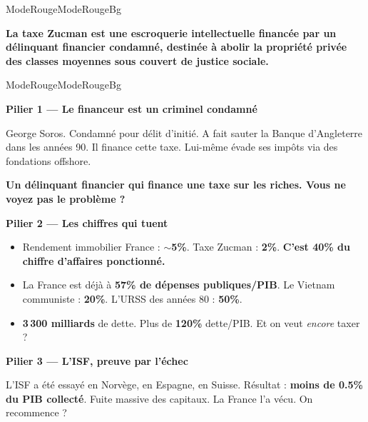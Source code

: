 \documentclass[a4paper,11pt]{article}
\newcommand{\phraseforte}[2][ModeRouge]{\textbf{\textcolor{#1}{\og{}#2\fg{}}}}
\newcommand{\stat}[1]{\textbf{\textcolor{ChapColor}{#1}}}
\begin{document}
\begin{fichemode}{ModeRouge}{ModeRougeBg}
\begin{thesebox}[ModeRouge]
{\large\bfseries La taxe Zucman est une escroquerie intellectuelle financ\'ee par un d\'elinquant financier condamn\'e, destin\'ee \`a abolir la propri\'et\'e priv\'ee des classes moyennes sous couvert de justice sociale.}
\end{thesebox}
\end{fichemode}

\vspace{3mm}

\begin{fichemode}{ModeRouge}{ModeRougeBg}

\textbf{\textcolor{ModeRougeDark}{ Pilier 1 --- Le financeur est un criminel condamn\'e}}

George Soros. Condamn\'e pour d\'elit d'initi\'e. A fait sauter la Banque d'Angleterre dans les ann\'ees 90. Il finance cette taxe. Lui-m\^eme \'evade ses imp\^ots via des fondations offshore.

\phraseforte[ModeRouge]{Un d\'elinquant financier qui finance une taxe sur les riches. Vous ne voyez pas le probl\`eme ?}

\vspace{3mm}
\textbf{\textcolor{ModeRougeDark}{ Pilier 2 --- Les chiffres qui tuent}}

\begin{itemize}[label=\textcolor{ModeRouge}{\textbullet}, itemsep=2pt]
  \item Rendement immobilier France : \stat{$\sim$5\%}. Taxe Zucman : \stat{2\%}. \textbf{C'est 40\% du chiffre d'affaires ponctionn\'e.}
  \item La France est d\'ej\`a \`a \stat{57\% de d\'epenses publiques/PIB}. Le Vietnam communiste : \stat{20\%}. L'URSS des ann\'ees 80 : \stat{50\%}.
  \item \stat{3\,300 milliards} de dette. Plus de \stat{120\%} dette/PIB. Et on veut \emph{encore} taxer ?
\end{itemize}

\vspace{3mm}
\textbf{\textcolor{ModeRougeDark}{ Pilier 3 --- L'ISF, preuve par l'\'echec}}

L'ISF a \'et\'e essay\'e en Norv\`ege, en Espagne, en Suisse. R\'esultat : \stat{moins de 0.5\% du PIB collect\'e}. Fuite massive des capitaux. La France l'a v\'ecu. On recommence ?

\end{fichemode}
\end{document}
